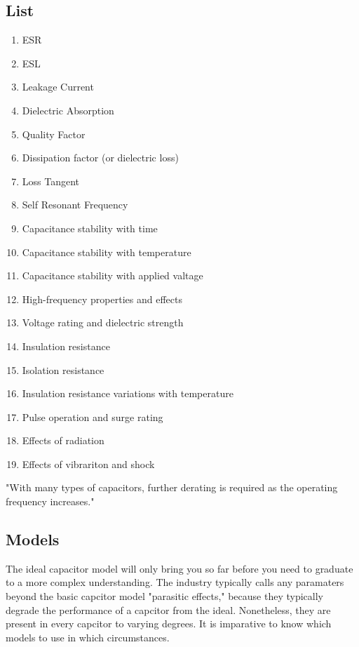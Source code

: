 \subsection{List}
\cite{leon_cap}
\begin{enumerate}
    \item ESR
    \item ESL
    \item Leakage Current
    \item Dielectric Absorption
    \item Quality Factor
    \item Dissipation factor (or dielectric loss)
    \item Loss Tangent
    \item Self Resonant Frequency
    \item Capacitance stability with time
    \item Capacitance stability with temperature
    \item Capacitance stability with applied valtage
    \item High-frequency properties and effects
    \item Voltage rating and dielectric strength
    \item Insulation resistance
    \item Isolation resistance
    \item Insulation resistance variations with temperature
    \item Pulse operation and surge rating
    \item Effects of radiation
    \item Effects of vibrariton and shock
\end{enumerate}

"With many types of capacitors, further derating is required as the operating frequency increases."\cite[Sect.~3.6.7]{elec_inv}

\subsection {Models}
The ideal capacitor model will only bring you so far before you need to graduate to a more complex understanding. The industry typically calls any paramaters beyond the basic capcitor model "parasitic effects," because they typically degrade the performance of a capcitor from the ideal. Nonetheless, they are present in every capcitor to varying degrees. It is imparative to know which models to use in which circumstances. 

